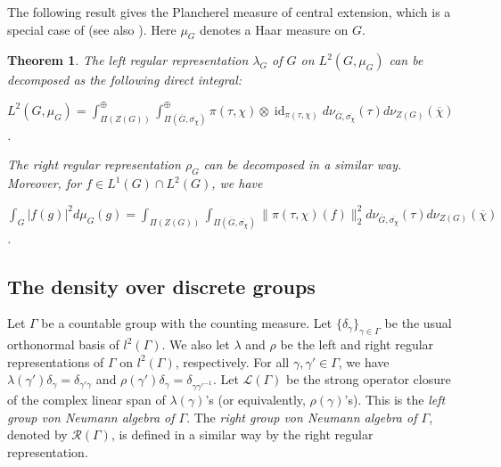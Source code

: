 \documentclass[11pt]{article}
\theoremstyle{plain}
\newtheorem{theorem}{Theorem}[section]
\theoremstyle{remark}
\theoremstyle{definition}
\DeclareMathOperator{\id}{id}
\begin{document}
The following result gives the Plancherel measure of central extension, which is a special case of \cite[Theorem 3]{KlpLips1973} (see also \cite[I Theorem 8.1, Theorem 10.2]{KlepLips1972}). 
Here $\mu_G$ denotes a Haar measure on $G$. 
\begin{theorem}\label{tcenextPfml}
The left regular representation $\lambda_G$ of $G$ on $L^2(G,\mu_G)$ can be decomposed as the following direct integral:
\begin{center}
$L^2(G,\mu_G)=\int_{\Pi(Z(G))}^{\oplus}\int_{\Pi(\overline{G},\overline{\sigma_{\chi}})}^{\oplus}\pi(\tau,\chi) \otimes \id_{\pi(\tau,\chi)}d\nu_{\overline{G},\overline{\sigma_{\chi}}}(\tau)d \nu_{Z(G)}(\overline{\chi})$.
\end{center}
The right regular representation $\rho_G$ can be decomposed in a similar way. 
Moreover, for $f\in L^1(G)\cap L^2(G)$, we have
\begin{center}
    $\int_{G}|f(g)|^2d \mu_G(g)=\int_{\Pi(Z(G))}\int_{\Pi(\overline{G},\overline{\sigma_{\chi}})}\|\pi(\tau,\chi)(f)\|_2^{2}d\nu_{\overline{G},\overline{\sigma_{\chi}}}(\tau)d \nu_{Z(G)}(\overline{\chi})$. 
\end{center}
\end{theorem}

\subsection{The density over discrete groups}\label{ssvndim}

Let $\Gamma$ be a countable group with the counting measure.  %
Let $\{\delta_{\gamma}\}_{\gamma\in \Gamma}$ be the usual orthonormal basis of $l^2(\Gamma)$. 
We also let $\lambda$ and $\rho$ be the left and right regular representations of $\Gamma$ on $l^2(\Gamma)$, respectively.
For all $\gamma,\gamma'\in \Gamma$, we have
$\lambda(\gamma')\delta_{\gamma}=\delta_{\gamma'\gamma}$ and $\rho(\gamma')\delta_{\gamma}=\delta_{\gamma\gamma'^{-1}}$. 
Let $\mathcal{L}(\Gamma)$ be the strong operator closure of the complex linear span of $\lambda(\gamma)$'s (or equivalently,  $\rho(\gamma)$'s). 
This is the {\it left group von Neumann algebra of $\Gamma$}. 
The {\it right group von Neumann algebra of $\Gamma$}, denoted by $\mathcal{R}(\Gamma)$, is defined in a similar way by the right regular representation. 
\end{document}

